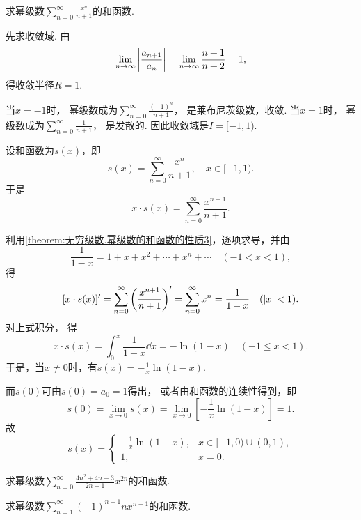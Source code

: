 \begin{example}
求幂级数\(\sum_{n=0}^\infty \frac{x^n}{n+1}\)的和函数.
\begin{solution}
先求收敛域.
由\[
	\lim_{n\to\infty} \abs{\frac{a_{n+1}}{a_n}}
	= \lim_{n\to\infty} \frac{n+1}{n+2}
	= 1,
\]
得收敛半径\(R=1\).

当\(x = -1\)时，
幂级数成为\(\sum_{n=0}^\infty \frac{(-1)^n}{n+1}\)，
是莱布尼茨级数，收敛.
当\(x = 1\)时，
幂级数成为\(\sum_{n=0}^\infty \frac{1}{n+1}\)，
是发散的.
因此收敛域是\(I = [-1,1)\).

设和函数为\(s(x)\)，即\[
	s(x) = \sum_{n=0}^\infty \frac{x^n}{n+1},
	\quad x\in[-1,1).
\]
于是\[
	x \cdot s(x) = \sum_{n=0}^\infty \frac{x^{n+1}}{n+1}.
\]

利用\cref{theorem:无穷级数.幂级数的和函数的性质3}，逐项求导，并由\[
	\frac{1}{1-x} = 1+x+x^2+\dotsb+x^n+\dotsb
	\quad(-1<x<1),
\]
得\[
	[x \cdot s(x)]'
	= \sum_{n=0}^\infty \left( \frac{x^{n+1}}{n+1} \right)'
	= \sum_{n=0}^\infty x^n
	= \frac{1}{1-x}
	\quad(\abs{x}<1).
\]
对上式积分，
得\[
	x \cdot s(x) = \int_0^x \frac{1}{1-x} \dd{x} = -\ln(1-x)
	\quad(-1 \leq x < 1).
\]
于是，当\(x\neq0\)时，有\(s(x) = -\frac{1}{x} \ln(1-x)\).

而\(s(0)\)可由\(s(0) = a_0 = 1\)得出，
或者由和函数的连续性得到，即\[
	s(0)
	= \lim_{x\to0} s(x)
	= \lim_{x\to0} \left[ -\frac{1}{x} \ln(1-x) \right]
	= 1.
\]
故\[
	s(x) = \left\{ \begin{array}{cl}
		-\frac{1}{x} \ln(1-x), & x\in[-1,0)\cup(0,1), \\
		1, & x=0.
	\end{array} \right.
\]
\end{solution}
\end{example}

\begin{example}
求幂级数\(\sum_{n=0}^\infty \frac{4n^2+4n+3}{2n+1} x^{2n}\)的和函数.
\end{example}
\begin{example}
求幂级数\(\sum_{n=1}^\infty (-1)^{n-1} n x^{n-1}\)的和函数.
\end{example}

